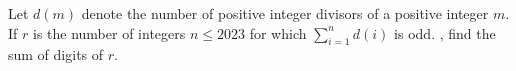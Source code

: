 Let $d(m)$ denote the number of positive integer divisors of a positive integer $m$. If $r$ is the number of integers  $n \leqslant 2023$ for which $\sum_{i=1}^{n} d(i)$ is odd. , find the sum of digits of $r.$
